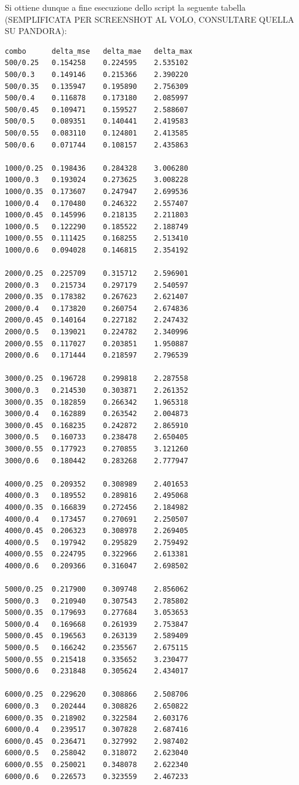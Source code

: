 Si ottiene dunque a fine esecuzione dello script la seguente tabella (SEMPLIFICATA PER SCREENSHOT AL VOLO, CONSULTARE QUELLA SU PANDORA):

\begin{lstlisting}[language=bash]
combo      delta_mse   delta_mae   delta_max
500/0.25   0.154258    0.224595    2.535102
500/0.3    0.149146    0.215366    2.390220
500/0.35   0.135947    0.195890    2.756309
500/0.4    0.116878    0.173180    2.085997
500/0.45   0.109471    0.159527    2.588607
500/0.5    0.089351    0.140441    2.419583
500/0.55   0.083110    0.124801    2.413585
500/0.6    0.071744    0.108157    2.435863

1000/0.25  0.198436    0.284328    3.006280
1000/0.3   0.193024    0.273625    3.008228
1000/0.35  0.173607    0.247947    2.699536
1000/0.4   0.170480    0.246322    2.557407
1000/0.45  0.145996    0.218135    2.211803
1000/0.5   0.122290    0.185522    2.188749
1000/0.55  0.111425    0.168255    2.513410
1000/0.6   0.094028    0.146815    2.354192

2000/0.25  0.225709    0.315712    2.596901
2000/0.3   0.215734    0.297179    2.540597
2000/0.35  0.178382    0.267623    2.621407
2000/0.4   0.173820    0.260754    2.674836
2000/0.45  0.140164    0.227182    2.247432
2000/0.5   0.139021    0.224782    2.340996
2000/0.55  0.117027    0.203851    1.950887
2000/0.6   0.171444    0.218597    2.796539

3000/0.25  0.196728    0.299818    2.287558
3000/0.3   0.214530    0.303871    2.261352
3000/0.35  0.182859    0.266342    1.965318
3000/0.4   0.162889    0.263542    2.004873
3000/0.45  0.168235    0.242872    2.865910
3000/0.5   0.160733    0.238478    2.650405
3000/0.55  0.177923    0.270855    3.121260
3000/0.6   0.180442    0.283268    2.777947

4000/0.25  0.209352    0.308989    2.401653
4000/0.3   0.189552    0.289816    2.495068
4000/0.35  0.166839    0.272456    2.184982
4000/0.4   0.173457    0.270691    2.250507
4000/0.45  0.206323    0.308978    2.269405
4000/0.5   0.197942    0.295829    2.759492
4000/0.55  0.224795    0.322966    2.613381
4000/0.6   0.209366    0.316047    2.698502

5000/0.25  0.217900    0.309748    2.856062
5000/0.3   0.210940    0.307543    2.785802
5000/0.35  0.179693    0.277684    3.053653
5000/0.4   0.169668    0.261939    2.753847
5000/0.45  0.196563    0.263139    2.589409
5000/0.5   0.166242    0.235567    2.675115
5000/0.55  0.215418    0.335652    3.230477
5000/0.6   0.231848    0.305624    2.434017

6000/0.25  0.229620    0.308866    2.508706
6000/0.3   0.202444    0.308826    2.650822
6000/0.35  0.218902    0.322584    2.603176
6000/0.4   0.239517    0.307828    2.687416
6000/0.45  0.236471    0.327992    2.987402
6000/0.5   0.258042    0.318072    2.623040
6000/0.55  0.250021    0.348078    2.622340
6000/0.6   0.226573    0.323559    2.467233
\end{lstlisting}

